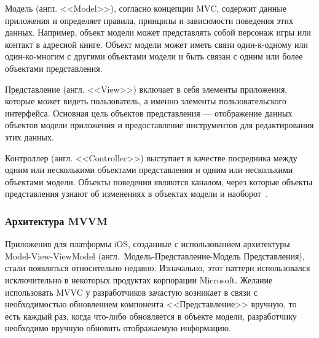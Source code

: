 Модель (англ. <<Model>>), согласно концепции MVC, содержит данные приложения и определяет правила,
принципы и зависимости поведения этих данных. Например, объект модели может
представлять собой персонаж игры или контакт в адресной книге.
Объект модели может иметь связи один-к-одному или один-ко-многим с другими
объектами модели и быть связан с одним или более объектами представления.

Представление (англ. <<View>>) включает в себя элементы приложения,
которые может видеть пользователь, а именно элементы пользовательского интерфейса.
Основная цель объектов представления --- отображение данных объектов модели приложения
и предоставление инструментов для редактирования этих данных.

Контроллер (англ. <<Controller>>) выступает в качестве посредника между одним или
несколькими объектами представления и одним или несколькими объектами модели.
Объекты поведения являются каналом, через которые объекты представления
узнают об изменениях в объектах модели и наоборот~\cite{mvc_apple_docs}.



\subsubsection{Архитектура MVVM}

Приложения для платформы iOS, созданные с использованием архитектуры
Model-View-ViewModel (англ.~Модель-Представление-Модель Представления),
стали появляться относительно недавно. Изначально, этот паттерн использовался
исключительно в некоторых продуктах корпорации Microsoft. Желание использовать
MVVC у разработчиков зачастую возникает в связи с необходимостью
обновлением компонента <<Представление>> вручную, то есть каждый раз, когда
что-либо обновляется в объекте модели, разработчику необходимо вручную
обновить отображаемую информацию.

